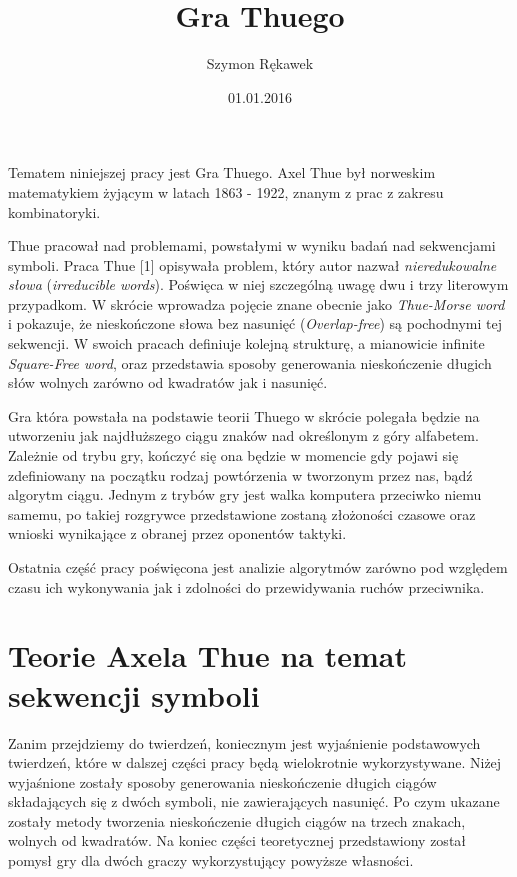 \documentclass[document]{xmgr}
\author   {Szymon Rękawek}
\title    {Gra Thuego}
\date     {01.01.2016}
\begin{document}
\begin{abstract}

\end{abstract}


\maketitle

\introduction

Tematem niniejszej pracy jest Gra Thuego. Axel Thue był norweskim matematykiem żyjącym w latach 1863 - 1922, znanym z prac z zakresu kombinatoryki.

Thue pracował nad problemami, powstałymi w wyniku badań nad sekwencjami symboli. Praca Thue [1] opisywała problem, który autor nazwał \textit{nieredukowalne słowa} (\textit{irreducible words}). Poświęca w niej szczególną uwagę dwu i trzy literowym przypadkom. W skrócie wprowadza pojęcie znane obecnie jako \textit{Thue-Morse word} i pokazuje, że nieskończone słowa bez nasunięć (\textit{Overlap-free}) są pochodnymi tej sekwencji. W swoich pracach definiuje kolejną strukturę, a mianowicie infinite \textit{Square-Free word}, oraz przedstawia sposoby generowania nieskończenie długich słów wolnych zarówno od kwadratów jak i nasunięć.

Gra która powstała na podstawie teorii Thuego w skrócie polegała będzie na utworzeniu jak najdłuższego ciągu znaków nad określonym z góry alfabetem. Zależnie od trybu gry, kończyć się ona będzie w momencie gdy pojawi się zdefiniowany na początku rodzaj powtórzenia w tworzonym przez nas, bądź algorytm ciągu. Jednym z trybów gry jest walka komputera przeciwko niemu samemu, po takiej rozgrywce przedstawione zostaną złożoności czasowe oraz wnioski wynikające z obranej przez oponentów taktyki. 

Ostatnia część pracy poświęcona jest analizie algorytmów zarówno pod względem czasu ich wykonywania jak i zdolności do przewidywania ruchów przeciwnika.

\chapter{Teorie Axela Thue na temat sekwencji symboli}
Zanim przejdziemy do twierdzeń, koniecznym jest wyjaśnienie podstawowych twierdzeń, które w dalszej części pracy będą wielokrotnie wykorzystywane. Niżej wyjaśnione zostały sposoby generowania nieskończenie długich ciągów składających się z dwóch symboli, nie zawierających nasunięć. Po czym ukazane zostały metody tworzenia nieskończenie długich ciągów na trzech znakach, wolnych od kwadratów. Na koniec części teoretycznej przedstawiony został pomysł gry dla dwóch graczy wykorzystujący powyższe własności.
\end{document}
